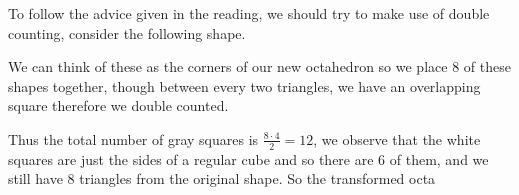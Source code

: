 \documentclass[11pt]{article}
\begin{document}
To follow the advice given in the reading, we should try to make use of double counting, consider the following shape.

We can think of these as the corners of our new octahedron so we place 8 of these shapes together, though between every two triangles, we have an overlapping square therefore we double counted. 

Thus the total number of gray squares is \(\frac{8 \cdot 4}{2}= 12\), we observe that the white squares are just the sides of a regular cube and so there are 6 of them, and we still have 8 triangles from the original shape. So the transformed octa
\end{document}
